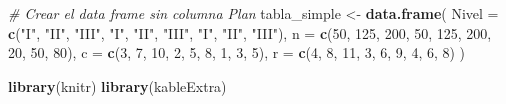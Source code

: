 \documentclass[
  12pt,
]{article}
\newenvironment{Shaded}{\begin{snugshade}}{\end{snugshade}}
\newcommand{\AttributeTok}[1]{\textcolor[rgb]{0.13,0.29,0.53}{#1}}
\newcommand{\CommentTok}[1]{\textcolor[rgb]{0.56,0.35,0.01}{\textit{#1}}}
\newcommand{\DecValTok}[1]{\textcolor[rgb]{0.00,0.00,0.81}{#1}}
\newcommand{\FunctionTok}[1]{\textcolor[rgb]{0.13,0.29,0.53}{\textbf{#1}}}
\newcommand{\NormalTok}[1]{#1}
\newcommand{\OtherTok}[1]{\textcolor[rgb]{0.56,0.35,0.01}{#1}}
\newcommand{\StringTok}[1]{\textcolor[rgb]{0.31,0.60,0.02}{#1}}
\begin{document}
\begin{Shaded}
\begin{Highlighting}[]
\CommentTok{\# Crear el data frame sin columna Plan}
\NormalTok{tabla\_simple }\OtherTok{\textless{}{-}} \FunctionTok{data.frame}\NormalTok{(}
  \AttributeTok{Nivel =} \FunctionTok{c}\NormalTok{(}\StringTok{"I"}\NormalTok{, }\StringTok{"II"}\NormalTok{, }\StringTok{"III"}\NormalTok{,}
            \StringTok{"I"}\NormalTok{, }\StringTok{"II"}\NormalTok{, }\StringTok{"III"}\NormalTok{,}
            \StringTok{"I"}\NormalTok{, }\StringTok{"II"}\NormalTok{, }\StringTok{"III"}\NormalTok{),}
  \AttributeTok{n =} \FunctionTok{c}\NormalTok{(}\DecValTok{50}\NormalTok{, }\DecValTok{125}\NormalTok{, }\DecValTok{200}\NormalTok{, }\DecValTok{50}\NormalTok{, }\DecValTok{125}\NormalTok{, }\DecValTok{200}\NormalTok{, }\DecValTok{20}\NormalTok{, }\DecValTok{50}\NormalTok{, }\DecValTok{80}\NormalTok{),}
  \AttributeTok{c =} \FunctionTok{c}\NormalTok{(}\DecValTok{3}\NormalTok{, }\DecValTok{7}\NormalTok{, }\DecValTok{10}\NormalTok{, }\DecValTok{2}\NormalTok{, }\DecValTok{5}\NormalTok{, }\DecValTok{8}\NormalTok{, }\DecValTok{1}\NormalTok{, }\DecValTok{3}\NormalTok{, }\DecValTok{5}\NormalTok{),}
  \AttributeTok{r =} \FunctionTok{c}\NormalTok{(}\DecValTok{4}\NormalTok{, }\DecValTok{8}\NormalTok{, }\DecValTok{11}\NormalTok{, }\DecValTok{3}\NormalTok{, }\DecValTok{6}\NormalTok{, }\DecValTok{9}\NormalTok{, }\DecValTok{4}\NormalTok{, }\DecValTok{6}\NormalTok{, }\DecValTok{8}\NormalTok{)}
\NormalTok{)}

\FunctionTok{library}\NormalTok{(knitr)}
\FunctionTok{library}\NormalTok{(kableExtra)}


\end{Highlighting}
\end{Shaded}
\end{document}
